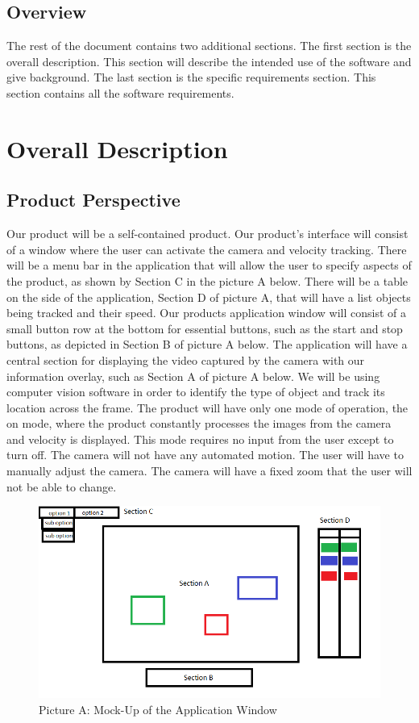 \documentclass[onecolumn, draftclsnofoot,10pt, compsoc]{IEEEtran}
\begin{document}
\subsection{Overview}
The rest of the document contains two additional sections.
The first section is the overall description.
This section will describe the intended use of the software and give background.
The last section is the specific requirements section.
This section contains all the software requirements.

\section{Overall Description}
\subsection{Product Perspective}
Our product will be a self-contained product. 
Our product's interface will consist of a window where the user can activate the camera and velocity tracking.
There will be a menu bar in the application that will allow the user to specify aspects of the product, as shown by Section C in the picture A below.
There will be a table on the side of the application, Section D of picture A, that will have a list objects being tracked and their speed.
Our products application window will consist of a small button row at the bottom for essential buttons, such as the start and stop buttons, as depicted in Section B of picture A below.
The application will have a central section for displaying the video captured by the camera with our information overlay, such as Section A of picture A below.
We will be using computer vision software in order to identify the type of object and track its location across the frame.
The product will have only one mode of operation, the on mode, where the product constantly processes the images from the camera and velocity is displayed.
This mode requires no input from the user except to turn off.
The camera will not have any automated motion.
The user will have to manually adjust the camera.
The camera will have a fixed zoom that the user will not be able to change.

\begin{figure}[ht]
    \centering
    \includegraphics[scale=0.75]{cs_461_mock_up}
    \caption{Picture A: Mock-Up of the Application Window}
    \label{fig: pic_a}
\end{figure}
\end{document}
